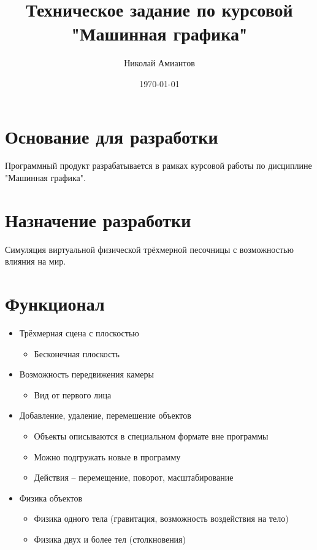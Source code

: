 \documentclass[a4paper,12pt]{article}
\title{Техническое задание по курсовой "Машинная графика"}
\author{Николай Амиантов}
\date{\today}
\begin{document}
\section{Основание для разработки}

Программный продукт разрабатывается в рамках курсовой работы по дисциплине "Машинная графика".

\section{Назначение разработки}

Симуляция виртуальной физической трёхмерной песочницы с возможностью влияния на мир.

\section{Функционал}
\begin{itemize}
  \item Трёхмерная сцена с плоскостью
  \begin{itemize}
    \item Бесконечная плоскость
  \end{itemize}
  \item Возможность передвижения камеры
  \begin{itemize}
    \item Вид от первого лица
  \end{itemize}
  \item Добавление, удаление, перемешение объектов
  \begin{itemize}
    \item Объекты описываются в специальном формате вне программы
    \item Можно подгружать новые в программу
    \item Действия -- перемещение, поворот, масштабирование
  \end{itemize}
  \item Физика объектов
  \begin{itemize}
    \item Физика одного тела (гравитация, возможность воздействия на тело)
    \item Физика двух и более тел (столкновения)
  \end{itemize}
\end{itemize}
\end{document}
